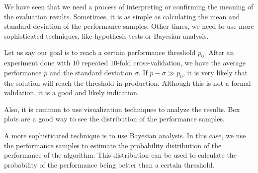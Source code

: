 We have seen that we need a process of interpreting or confirming the meaning of the
evaluation results.
Sometimes, it is as simple as calculating the mean and standard deviation of the
performance samples.  Other times, we need to use more sophisticated techniques, like
hypothesis tests or Bayesian analysis.

Let us say our goal is to reach a certain performance threshold $p_0$.  After an
experiment done with $10$ repeated $10$-fold cross-validation, we have the average
performance $\bar{p}$ and the standard deviation $\sigma$.  If $\bar{p} - \sigma \gg
p_0$, it is very likely that the solution will reach the threshold in production.
Although this is not a formal validation, it is a good and likely indication.

Also, it is common to use visualization techniques to analyze the results.  Box plots are
a good way to see the distribution of the performance samples.

A more sophisticated technique is to use Bayesian analysis.  In this case, we use the
performance samples to estimate the probability distribution of the performance of the
algorithm.  This distribution can be used to calculate the probability of the performance
being better than a certain threshold.

